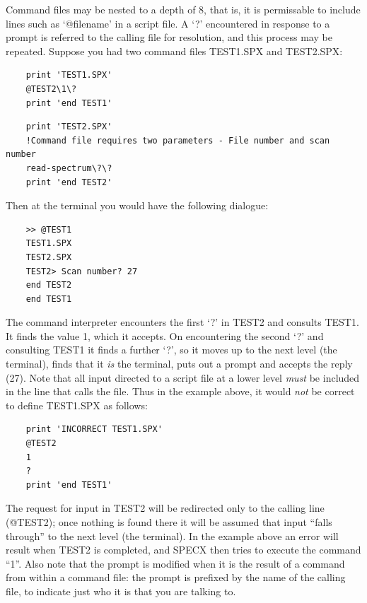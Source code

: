 \documentclass[11pt,twoside]{report}
\begin{document}
Command files may be nested to a depth of 8, that
is, it is permissable to include lines such as `@filename' in a script
file. A `?' encountered in response to a prompt is referred to
the calling file for resolution, and this process may be repeated. Suppose you
had two command files TEST1.SPX and TEST2.SPX:

\begin{verbatim}
    print 'TEST1.SPX'
    @TEST2\1\?
    print 'end TEST1'
\end{verbatim}

\begin{verbatim}
    print 'TEST2.SPX'
    !Command file requires two parameters - File number and scan number
    read-spectrum\?\?
    print 'end TEST2'
\end{verbatim}

Then at the terminal you would have the following dialogue:

\begin{verbatim}
    >> @TEST1
    TEST1.SPX
    TEST2.SPX
    TEST2> Scan number? 27
    end TEST2
    end TEST1
\end{verbatim}

The command interpreter encounters the first `?' in TEST2 and consults
TEST1. It finds the value 1, which it accepts. On encountering the second `?'
and consulting TEST1 it finds a further `?', so it moves up to the next level
(the terminal), finds that it {\em is} the terminal, puts out a prompt and
accepts the reply (27). Note that all input directed to a script
file at a lower level {\em must} be included in the line that calls the file.
Thus in the example above, it would {\em not} be correct to define TEST1.SPX
as follows:

\begin{verbatim}
    print 'INCORRECT TEST1.SPX'
    @TEST2
    1
    ?
    print 'end TEST1'
\end{verbatim}

The request for input in TEST2 will be redirected only to the calling line
(@TEST2); once nothing is found there it will be assumed that input ``falls
through'' to the next level (the terminal). In the example above an error will
result when TEST2 is completed, and SPECX then tries to execute the command
``1''. Also note that the prompt is modified when it is
the result of a command from within a command file: the prompt is prefixed by
the name of the calling file, to indicate just who it is that you are talking
to.
\end{document}
